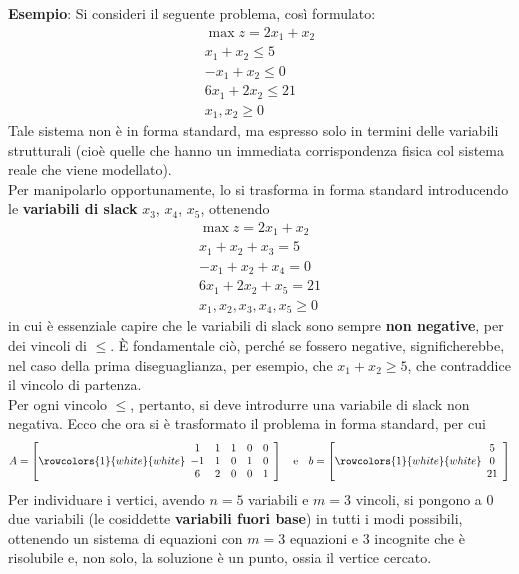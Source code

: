 \documentclass[a4paper]{extarticle}
\begin{document}
\vspace{2em}
\noindent
\textbf{Esempio}: Si consideri il seguente problema, così formulato:
\begin{align*}
    \max z = 2 x_1 + x_2\\
    x_1+x_2 \leq 5\\
    -x_1+x_2 \leq 0\\
    6x_1 + 2x_2 \leq 21\\
    x_1,x_2 \geq 0
\end{align*}
Tale sistema non è in forma standard, ma espresso solo in termini delle variabili strutturali (cioè quelle che hanno un immediata corrispondenza fisica col sistema reale che viene modellato).\\
Per manipolarlo opportunamente, lo si trasforma in forma standard introducendo le \textbf{variabili di slack} $x_3$, $x_4$, $x_5$, ottenendo
\begin{align*}
    \max z = 2 x_1 + x_2\\
    x_1+x_2+x_3=5\\
    -x_1+x_2+x_4=0\\
    6x_1 + 2x_2+x_5=21\\
    x_1,x_2,x_3,x_4,x_5 \geq 0
\end{align*}
in cui è essenziale capire che le variabili di slack sono sempre \textbf{non negative}, per dei vincoli di $\leq$. È fondamentale ciò, perché se fossero negative, significherebbe, nel caso della prima diseguaglianza, per esempio, che $x_1+x_2 \geq 5$, che contraddice il vincolo di partenza.\\
Per ogni vincolo $\leq$, pertanto, si deve introdurre una variabile di slack non negativa. Ecco che ora si è trasformato il problema in forma standard, per cui
\[A = \left[
    \rowcolors{1}{white}{white}
    \begin{array}{ccccc}
        1 & 1 & 1 & 0 & 0\\
        -1 & 1 & 0 & 1 & 0\\
        6 & 2 & 0 & 0 & 1
    \end{array}
\right] \hspace{1em} \text{e} \hspace{1em} b = \left[
    \rowcolors{1}{white}{white}
    \begin{array}{c}
        5\\
        0\\
        21
    \end{array}
\right]\]
Per individuare i vertici, avendo $n=5$ variabili e $m=3$ vincoli, si pongono a $0$ due variabili (le cosiddette \textbf{variabili fuori base}) in tutti i modi possibili, ottenendo un sistema di equazioni con $m=3$ equazioni e $3$ incognite che è risolubile e, non solo, la soluzione è un punto, ossia il vertice cercato.
\end{document}
